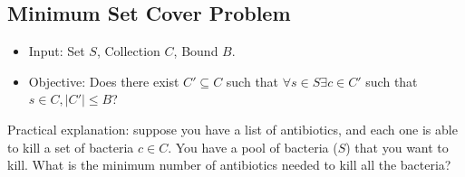 \documentclass[10pt]{article}
\begin{document}
\subsection*{Minimum Set Cover Problem}
\begin{itemize}
	\item Input: Set $S$, Collection $C$, Bound $B$.
	\item Objective: Does there exist $C' \subseteq C$ such that $\forall s \in S \exists c \in C'$ such that $s \in C, |C'| \leq B$?
\end{itemize}
Practical explanation: suppose you have a list of antibiotics, and each one is able to kill a set of bacteria $c \in C$.  You have a pool of bacteria ($S$) that you want to kill.  What is the minimum number of antibiotics needed to kill all the bacteria?
\end{document}
